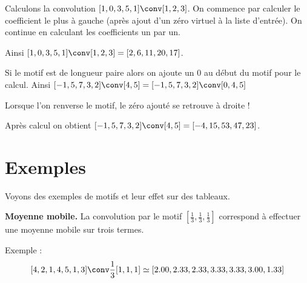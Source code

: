 \documentclass[11pt,class=report,crop=false]{standalone}
\begin{document}
\begin{exemple}
Calculons la convolution $[1,0,3,5,1] \conv [1,2,3]$.
On commence par calculer le coefficient le plus à gauche (après ajout d'un zéro virtuel à la liste d'entrée).
On continue en calculant les coefficients un par un.

Ainsi  $[1,0,3,5,1] \conv [1,2,3] = [2,6,11,20,17]$.
\end{exemple}



\begin{exemple}
Si le motif est de longueur paire alors on ajoute un $0$ au début du motif pour le calcul.
Ainsi $[-1,5,7,3,2] \conv [4,5] = [-1,5,7,3,2] \conv [0,4,5]$

Lorsque l'on renverse le motif, le zéro ajouté se retrouve à droite !


Après calcul on obtient $[-1,5,7,3,2] \conv [4,5] = [-4, 15, 53, 47, 23]$.

\end{exemple}

\section{Exemples}

Voyons des exemples de motifs et leur effet sur des tableaux.

\textbf{Moyenne mobile.}
La convolution par le motif $[\frac13,\frac13,\frac13]$ correspond à effectuer une moyenne mobile sur trois termes.

Exemple :
$$[4, 2, 1, 4, 5, 1, 3] \conv \frac13[1,1,1] \simeq [2.00, 2.33, 2.33, 3.33, 3.33, 3.00, 1.33]$$
\end{document}
